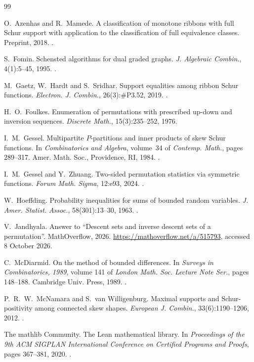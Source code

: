 \documentclass[12pt]{article}
\numberwithin{theorem}{section}
\numberwithin{equation}{section}
\begin{document}
\begin{thebibliography}{99}

 O.~Azenhas and R.~Mamede.
A classification of monotone ribbons with full Schur support with application to the classification of full
equivalence classes. Preprint, 2018. .

 S.~Fomin.
Schensted algorithms for dual graded graphs.
\emph{J. Algebraic Combin.}, 4(1):5--45, 1995. .

 M.~Gaetz, W.~Hardt and S.~Sridhar.
Support equalities among ribbon Schur functions.
\emph{Electron. J. Combin.}, 26(3):\#P3.52, 2019. .

 H.~O.~Foulkes.
Enumeration of permutations with prescribed up-down and inversion sequences.
\emph{Discrete Math.}, 15(3):235--252, 1976.

 I.~M.~Gessel.
Multipartite $P$-partitions and inner products of skew Schur functions.
In \emph{Combinatorics and Algebra}, volume~34 of \emph{Contemp. Math.}, pages 289--317.
Amer. Math. Soc., Providence, RI, 1984. .

 I.~M.~Gessel and Y.~Zhuang.
Two-sided permutation statistics via symmetric functions.
\emph{Forum Math. Sigma}, 12:e93, 2024. .

 W.~Hoeffding.
Probability inequalities for sums of bounded random variables.
\emph{J. Amer. Statist. Assoc.}, 58(301):13--30, 1963. .

 V.~Jandhyala.
Answer to ``Descent sets and inverse descent sets of a permutation''.
MathOverflow, 2026. \url{https://mathoverflow.net/a/515793}, accessed 8 October 2026.

 C.~McDiarmid.
On the method of bounded differences.
In \emph{Surveys in Combinatorics, 1989}, volume 141 of \emph{London Math. Soc. Lecture Note Ser.}, pages
148--188. Cambridge Univ. Press, 1989. .

 P.~R.~W.~McNamara and S.~van Willigenburg.
Maximal supports and Schur-positivity among connected skew shapes.
\emph{European J. Combin.}, 33(6):1190--1206, 2012. .

 The mathlib Community.
The Lean mathematical library.
In \emph{Proceedings of the 9th ACM SIGPLAN International Conference on Certified Programs and Proofs},
pages 367--381, 2020. .


\end{thebibliography}
\end{document}
